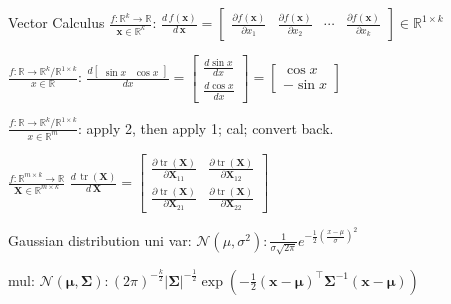 \documentclass[UTF8,a4paper]{article}
\begin{document}
\begin{cheatsheetblock}{Vector Calculus}
    $\frac{f: \mathbb{R}^k \rightarrow \mathbb{R}}{\bm{x} \in \mathbb{R}^k}$: \hfill
    $\frac{d\,f(\bm{x})}{d\,\bm{x}}=\left[\begin{array}{cccc}
                \frac{\partial f(\bm{x})}{\partial x_1} & \frac{\partial f(\bm{x})}{\partial x_2} & \cdots & \frac{\partial f(\bm{x})}{\partial x_k}
            \end{array}\right] \in \mathbb{R}^{1 \times k}$

    $\frac{f: \mathbb{R} \rightarrow \mathbb{R}^k / \mathbb{R}^{1 \times k}}{x \in \mathbb{R}}$: \hfill
    $\frac{d\left[\begin{array}{ll}
                    \sin x & \cos x
                \end{array}\right]}{d x}=\left[\begin{array}{l}
                \frac{d \sin x}{d x} \\
                \frac{d \cos x}{d x}
            \end{array}\right]=\left[\begin{array}{c}
                \cos x \\
                -\sin x
            \end{array}\right]$

    $\frac{f: \mathbb{R} \rightarrow \mathbb{R}^k / \mathbb{R}^{1 \times k}}{x \in \mathbb{R}^m}$: \hfill
    apply 2, then apply 1; cal; convert back.

    $\frac{f: \mathbb{R}^{m \times k} \rightarrow \mathbb{R}}{\bm{X} \in \mathbb{R}^{m \times k}}$ \hfill
    $\frac{d\, \operatorname{tr}(\bm{X})}{d\, \bm{X}} = \begin{bmatrix}
        \frac{\partial \operatorname{tr} (\bm{X})}{\partial \bm{X}_{11}} & \frac{\partial \operatorname{tr} (\bm{X})}{\partial \bm{X}_{12}} \\
        \frac{\partial \operatorname{tr} (\bm{X})}{\partial \bm{X}_{21}} & \frac{\partial \operatorname{tr} (\bm{X})}{\partial \bm{X}_{22}}
    \end{bmatrix}$
\end{cheatsheetblock}

\begin{cheatsheetblock}{Gaussian distribution}
    uni var: \hfill $\mathcal{N}\left(\mu, \sigma^2\right): \frac{1}{\sigma \sqrt{2 \pi}} e^{-\frac{1}{2}\left(\frac{x-\mu}{\sigma}\right)^2}$

    mul: \hfill $\mathcal{N}\left(\boldsymbol{\mu}, \boldsymbol{\Sigma}\right): (2\pi)^{-\frac{k}{2}}|\boldsymbol{\Sigma}|^{-\frac{1}{2}} \exp \left(-\frac{1}{2}(\boldsymbol{x}-\boldsymbol{\mu})^{\top} \boldsymbol{\Sigma}^{-1}(\boldsymbol{x}-\boldsymbol{\mu})\right)$
\end{cheatsheetblock}
\end{document}
